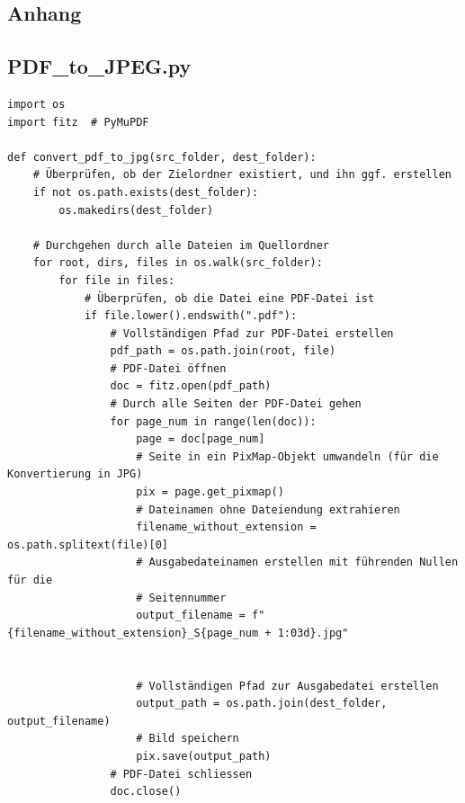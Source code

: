 \documentclass[12pt, a4paper, ngerman, bidi=default]{article}
\begin{document}
\begin{description}
\begingroup
\small
\singlespacing%
\printbibliography[
heading=bibintoc,
title={References}%
]
\endgroup

\newpage
\appendix
\section{Anhang}
\begingroup
\small
\subsection{PDF\_to\_JPEG.py}\label{section:PDF_to_JPEG}
\begin{verbatim}
import os
import fitz  # PyMuPDF

def convert_pdf_to_jpg(src_folder, dest_folder):
    # Überprüfen, ob der Zielordner existiert, und ihn ggf. erstellen
    if not os.path.exists(dest_folder):
        os.makedirs(dest_folder)

    # Durchgehen durch alle Dateien im Quellordner
    for root, dirs, files in os.walk(src_folder):
        for file in files:
            # Überprüfen, ob die Datei eine PDF-Datei ist
            if file.lower().endswith(".pdf"):
                # Vollständigen Pfad zur PDF-Datei erstellen
                pdf_path = os.path.join(root, file)
                # PDF-Datei öffnen
                doc = fitz.open(pdf_path)
                # Durch alle Seiten der PDF-Datei gehen
                for page_num in range(len(doc)):
                    page = doc[page_num]
                    # Seite in ein PixMap-Objekt umwandeln (für die Konvertierung in JPG)
                    pix = page.get_pixmap()
                    # Dateinamen ohne Dateiendung extrahieren
                    filename_without_extension = os.path.splitext(file)[0]
                    # Ausgabedateinamen erstellen mit führenden Nullen für die 
                    # Seitennummer
                    output_filename = f"{filename_without_extension}_S{page_num + 1:03d}.jpg"


                    # Vollständigen Pfad zur Ausgabedatei erstellen
                    output_path = os.path.join(dest_folder, output_filename)
                    # Bild speichern
                    pix.save(output_path)
                # PDF-Datei schliessen
                doc.close()
                

\end{verbatim}
\end{description}
\end{document}
